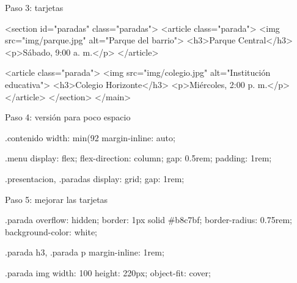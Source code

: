 \documentclass[aspectratio=169,11pt]{beamer}
\begin{document}
    \begin{frame}[fragile]{Paso 3: tarjetas}
        \begin{htmlcodedark}
        <section id="paradas" class="paradas">
            <article class="parada">
                <img src="img/parque.jpg" alt="Parque del barrio">
                <h3>Parque Central</h3>
                <p>Sábado, 9:00 a. m.</p>
            </article>

            <article class="parada">
                <img src="img/colegio.jpg" alt="Institución educativa">
                <h3>Colegio Horizonte</h3>
                <p>Miércoles, 2:00 p. m.</p>
            </article>
    </section>
    </main>
        \end{htmlcodedark}
    \end{frame}

    \begin{frame}[fragile]{Paso 4: versión para poco espacio}
        \vspace{-0.45cm}
        \begin{csscodedark}
            .contenido {
                width: min(92%
                margin-inline: auto;
            }

            .menu {
                display: flex;
                flex-direction: column;
                gap: 0.5rem;
                padding: 1rem;
            }

            .presentacion,
            .paradas {
                display: grid;
                gap: 1rem;
            }
        \end{csscodedark}
    \end{frame}

    \begin{frame}[fragile]{Paso 5: mejorar las tarjetas}
        \vspace{-0.45cm}
        \begin{csscodedark}
            .parada {
                overflow: hidden;
                border: 1px solid #b8c7bf;
                border-radius: 0.75rem;
                background-color: white;
            }

            .parada h3,
            .parada p {
                margin-inline: 1rem;
            }

            .parada img {
                width: 100%
                height: 220px;
                object-fit: cover;
            }
        \end{csscodedark}
    \end{frame}
\end{document}
